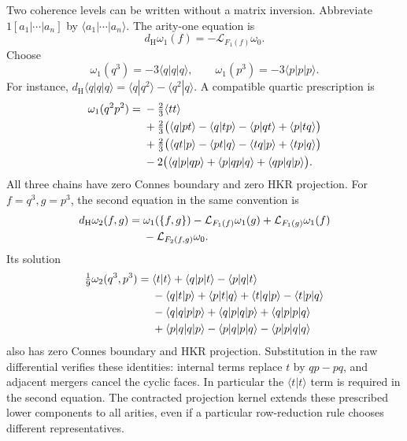 Two coherence levels can be written without a matrix inversion.
Abbreviate $1[a_1|\cdots|a_n]$ by
$\langle a_1|\cdots|a_n\rangle$. The arity-one equation is
\[
 d_{\mathrm H}\omega_1(f)=-\mathcal L_{F_1(f)}\omega_0.
\]
Choose
\begin{equation}\label{eq:vol2-cyclic-cubic-primitives}
 \omega_1(q^3)=-3\langle q|q|q\rangle,
 \qquad \omega_1(p^3)=-3\langle p|p|p\rangle.
\end{equation}
For instance,
$d_{\mathrm H}\langle q|q|q\rangle
=\langle q|q^2\rangle-\langle q^2|q\rangle$.
A compatible quartic prescription is
\begin{align}
 \omega_1(q^2p^2)
 ={}&-\tfrac23\langle tt\rangle
       \label{eq:vol2-cyclic-quartic-primitive}\\
 &+\tfrac23\bigl(
       \langle q|pt\rangle-\langle q|tp\rangle
      -\langle p|qt\rangle+\langle p|tq\rangle\bigr)\notag\\
 &+\tfrac23\bigl(
       \langle qt|p\rangle-\langle pt|q\rangle
      -\langle tq|p\rangle+\langle tp|q\rangle\bigr)\notag\\
 &-2\bigl(\langle q|p|qp\rangle
           +\langle p|qp|q\rangle+\langle qp|q|p\rangle\bigr).
       \notag
\end{align}
All three chains have zero Connes boundary and zero HKR
projection. For $f=q^3,g=p^3$, the second equation in the same
convention is
\begin{align}
 d_{\mathrm H}\omega_2(f,g)
 ={}&\omega_1(\{f,g\})
       -\mathcal L_{F_1(f)}\omega_1(g)
       +\mathcal L_{F_1(g)}\omega_1(f)\notag\\
    &-\mathcal L_{F_2(f,g)}\omega_0.
       \label{eq:vol2-cyclic-second-equation}
\end{align}
Its solution
\begin{align}
 \tfrac19\omega_2(q^3,p^3)
 ={}&\langle t|t\rangle
      +\langle q|p|t\rangle-\langle p|q|t\rangle
       \label{eq:vol2-cyclic-second-primitive}\\
    &-\langle q|t|p\rangle+\langle p|t|q\rangle
      +\langle t|q|p\rangle-\langle t|p|q\rangle\notag\\
    &-\langle q|q|p|p\rangle+\langle q|p|q|p\rangle
      +\langle q|p|p|q\rangle\notag\\
    &+\langle p|q|q|p\rangle-\langle p|q|p|q\rangle
      -\langle p|p|q|q\rangle\notag
\end{align}
also has zero Connes boundary and HKR projection.
Substitution in the raw differential verifies these identities:
internal terms replace $t$ by $qp-pq$, and adjacent mergers
cancel the cyclic faces. In particular the
$\langle t|t\rangle$ term is required in the second equation.
The contracted projection kernel extends these prescribed
lower components to all arities, even if a particular
row-reduction rule chooses different representatives.

